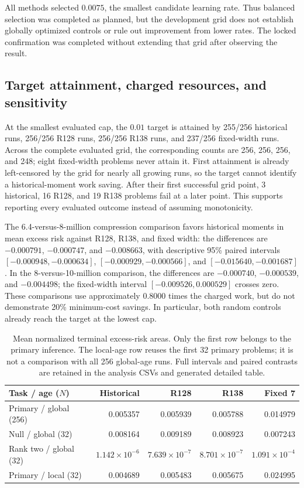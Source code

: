 \documentclass[10pt]{article}
\begin{document}
All methods selected $0.0075$, the smallest candidate learning rate.
Thus balanced selection was completed as planned, but the development
grid does not establish globally optimized controls or rule out
improvement from lower rates. The locked confirmation was completed
without extending that grid after observing the result.

\subsection{Target attainment, charged resources, and sensitivity}
At the smallest evaluated cap, the $0.01$ target is attained by
255/256 historical runs, 256/256 R128 runs, 256/256 R138 runs, and
237/256 fixed-width runs. Across the complete evaluated grid, the
corresponding counts are 256, 256, 256, and 248; eight fixed-width
problems never attain it. First attainment is already left-censored
by the grid for nearly all growing runs, so the target cannot identify
a historical-moment work saving. After their first successful grid
point, 3 historical, 16 R128, and 19 R138 problems fail at a later
point. This supports reporting every evaluated outcome instead of
assuming monotonicity.

The 6.4-versus-8-million compression comparison favors historical
moments in mean excess risk against R128, R138, and fixed width:
the differences are $-0.000791$, $-0.000747$, and $-0.008663$,
with descriptive 95\% paired intervals
$[-0.000948,-0.000634]$, $[-0.000929,-0.000566]$, and
$[-0.015640,-0.001687]$. In the 8-versus-10-million comparison,
the differences are $-0.000740$, $-0.000539$, and $-0.004498$;
the fixed-width interval $[-0.009526,0.000529]$ crosses zero.
These comparisons use approximately 0.8000 times the charged work,
but do not demonstrate 20\% minimum-cost savings. In particular,
both random controls already reach the target at the lowest cap.

\begin{table}[t]
\centering\small
\begin{tabular}{lrrrr}
\toprule
Task / age ($N$) & Historical & R128 & R138 & Fixed 7\\
\midrule
Primary / global (256) & 0.005357 & 0.005939 & 0.005788 & 0.014979\\
Null / global (32) & 0.008164 & 0.009189 & 0.008923 & 0.007243\\
Rank two / global (32) & $1.142\!\times\!10^{-6}$ & $7.639\!\times\!10^{-7}$ & $8.701\!\times\!10^{-7}$ & $1.091\!\times\!10^{-4}$\\
Primary / local (32) & 0.004689 & 0.005483 & 0.005675 & 0.024995\\
\bottomrule
\end{tabular}
\caption{Mean normalized terminal excess-risk areas. Only the first row
belongs to the primary inference. The local-age row reuses the first
32 primary problems; it is not a comparison with all 256 global-age
runs. Full intervals and paired contrasts are retained in the
analysis CSVs and generated detailed table.}
\label{tab:groupmeans}
\end{table}
\end{document}
